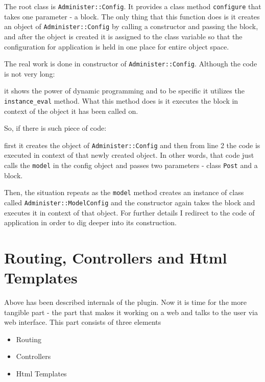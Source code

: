         The root class is \texttt{Administer::Config}. It provides a class method \texttt{configure} that
        takes one parameter - a block. The only thing that this function does is it creates an object of
        \texttt{Administer::Config} by calling a constructor and passing the block, and after the object
        is created it is assigned to the class variable so that the configuration for application is held
        in one place for entire object space. 
        
        The real work is done in constructor of \texttt{Administer::Config}. Although the code is not
        very long:
        
        
        
        it shows the power of dynamic programming and to be specific it utilizes the \texttt{instance\_eval}
        method. What this method does is it executes the block in context of the object it has been called on.
        
        So, if there is such piece of code:

        

        first it creates the object of \texttt{Administer::Config} and then from line 2 the code is executed
        in context of that newly created object. In other words, that code just calls the \texttt{model} in 
        the config object and passes two parameters - class \texttt{Post} and a block.
        
        Then, the situation repeats as the \texttt{model} method creates an instance of class called
        \texttt{Administer::ModelConfig} and the constructor again takes the block 
        and executes it in context of that object. For further details I redirect to the code of application
        in order to dig deeper into its construction.
        
  \section{Routing, Controllers and Html Templates}
    Above has been described internals of the plugin. Now it is time for the more tangible part - the part
    that makes it working on a web and talks to the user via web interface. This part consists of three 
    elements 
    \begin{itemize}
      \item Routing
      \item Controllers
      \item Html Templates
    \end{itemize}
    
